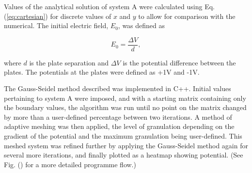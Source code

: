 \documentclass[a4paper]{jpconf}
\begin{document}
Values of the analytical solution of system A were calculated using Eq.(\ref{eq:cartesian}) for discrete values of $x$ and $y$ to allow for comparison with the numerical. The initial electric field, $E_0$, was defined as

\begin{equation}
	E_0 = \frac{\Delta V}{d},
\end{equation} 

\noindent where $d$ is the plate separation and $\Delta V$ is the potential difference between the plates. The potentials at the plates were defined as +1V and -1V.


The Gauss-Seidel method described was implemented in C++. Initial values pertaining to system A were imposed, and with a starting matrix containing only the boundary values, the algorithm was run until no point on the matrix changed by more than a user-defined percentage between two iterations. A method of adaptive meshing was then applied, the level of granulation depending on the gradient of the potential and the maximum granulation being user-defined. This meshed system was refined further by applying the Gauss-Seidel method again for several more iterations, and finally plotted as a heatmap showing potential. (See Fig. () for a more detailed programme flow.)

\end{document}
